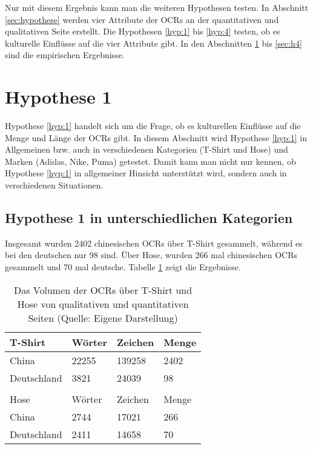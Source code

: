 Nur mit diesem Ergebnis kann man die weiteren Hypothesen testen. In Abschnitt \ref{sec:hypothese} werden vier Attribute der \ac{OCRs} an der quantitativen und qualitativen Seite erstellt. Die Hypothesen \ref{hyp:1} bis \ref{hyp:4} testen, ob es kulturelle Einflüsse auf die vier Attribute gibt. In den Abschnitten \ref{sec:h1} bis \ref{sec:h4} sind die empirischen Ergebnisse.
\section{Hypothese 1} \label{sec:h1}
Hypothese \ref{hyp:1} handelt sich um die Frage, ob es kulturellen Einflüsse auf die Menge und Länge der \ac{OCRs} gibt. In diesem Abschnitt wird Hypothese \ref{hyp:1} in Allgemeinen \ac{bzw.} auch in verschiedenen Kategorien (T-Shirt und Hose) und Marken (Adidas, Nike, Puma) getestet. Damit kann man nicht nur kennen, ob Hypothese \ref{hyp:1} in allgemeiner Hinsicht unterstützt wird, sondern auch in verschiedenen Situationen.
\subsection{Hypothese 1 in unterschiedlichen Kategorien}
Insgesamt wurden 2402 chinesischen \ac{OCRs} über T-Shirt gesammelt, während es bei den deutschen nur 98 sind. Über Hose, wurden 266 mal chinesischen \ac{OCRs} gesammelt und 70 mal deutsche. Tabelle \ref{tab:volumenTshirtHose} zeigt die Ergebnisse.
\begin{table}[htb]
\centering
\begin{tabular}{|llll|}
\hline
\multicolumn{1}{|l|}{T-Shirt}     & \multicolumn{1}{l|}{Wörter} & \multicolumn{1}{l|}{Zeichen} & Menge \\ \hline
\multicolumn{1}{|l|}{China}       & \multicolumn{1}{l|}{22255}  & \multicolumn{1}{l|}{139258}  & 2402   \\ \hline
\multicolumn{1}{|l|}{Deutschland} & \multicolumn{1}{l|}{3821}   & \multicolumn{1}{l|}{24039}   & 98     \\ \hline
                                  &                             &                              &        \\ \hline
\multicolumn{1}{|l|}{Hose}        & \multicolumn{1}{l|}{Wörter} & \multicolumn{1}{l|}{Zeichen} & Menge \\ \hline
\multicolumn{1}{|l|}{China}       & \multicolumn{1}{l|}{2744}   & \multicolumn{1}{l|}{17021}   & 266   \\ \hline
\multicolumn{1}{|l|}{Deutschland} & \multicolumn{1}{l|}{2411}   & \multicolumn{1}{l|}{14658}   & 70     \\ \hline
\end{tabular}
\caption[Das Volumen der OCRs über T-Shirt und Hose von qualitativen und quantitativen Seiten]{Das Volumen der \ac{OCRs} über T-Shirt und Hose von qualitativen und quantitativen Seiten (Quelle: Eigene Darstellung)}
\label{tab:volumenTshirtHose}
\end{table}


